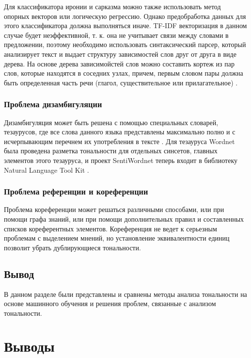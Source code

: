 \documentclass[a4paper,14pt, unknownkeysallowed]{extreport}
\begin{document}
Для классификатора иронии и сарказма можно также использовать метод опорных векторов или логическую регрессию. Однако предобработка данных для этого классификатора должна выполняться иначе. TF-IDF векторизация в данном случае будет неэффективной, т. к. она не учитывает связи между словами в предложении, поэтому необходимо использовать синтаксический парсер, который анализирует текст и выдает структуру зависимостей слов друг от друга в виде дерева. На основе дерева зависимойстей слов можно составить кортеж из пар слов, которые находятся в соседних узлах, причем, первым словом пары должна быть определенная часть речи (глагол, существительное или прилагательное) \cite{Volkova}.

\subsection{Проблема дизамбигуляции}

Дизамбигуляция может быть решена с помощью специальных словарей, тезаурусов, где все слова данного языка представлены максимально полно и с исчерпывающим перечнем их употребления в тексте \cite{BRE}. Для тезауруса Wordnet была проведена разметка тональности для отдельных синсетов, главных элементов этого тезауруса, и проект SentiWordnet теперь входит в библиотеку Natural Language Tool Kit \cite{Semina2}.

\subsection{Проблема референции и кореференции}

Проблема кореференции может решаться различными способами, или при помощи графа знаний, или при помощи дополнительных правил и составленных списков кореферентных элементов. Кореференция не ведет к серьезным проблемам с выделением мнений, но установление эквивалентности единиц позволит убрать дублирующиеся тональности.

\section{Вывод}

В данном разделе были представлены и сравнены методы анализа тональности на основе машинного обучения и решения проблем, связанные с анализом тональности.

\chapter*{Выводы}
\end{document}
